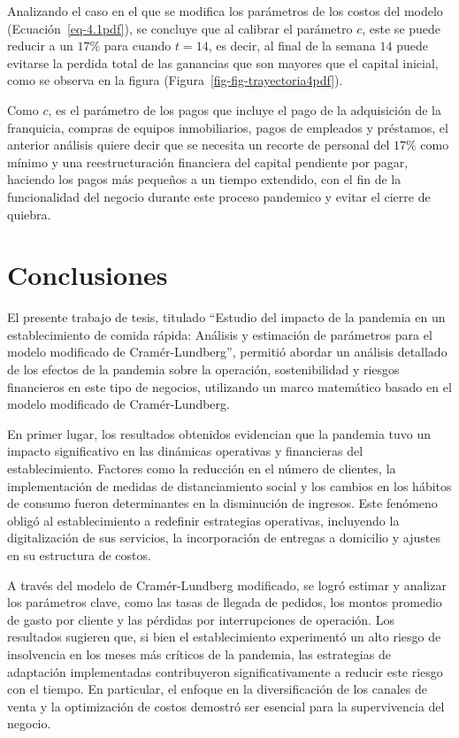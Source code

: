 \documentclass[
  us-letterpaper,
]{scrreprt}
\theoremstyle{plain}
\theoremstyle{plain}
\theoremstyle{definition}
\theoremstyle{remark}
\begin{document}
Analizando el caso en el que se modifica los parámetros de los costos
del modelo (Ecuación~\ref{eq-4.1pdf}), se concluye que al calibrar el
parámetro \(c\), este se puede reducir a un \(17 \%\) para cuando
\(t=14\), es decir, al final de la semana \(14\) puede evitarse la
perdida total de las ganancias que son mayores que el capital inicial,
como se observa en la figura (Figura~\ref{fig-fig-trayectoria4pdf}).

Como \(c\), es el parámetro de los pagos que incluye el pago de la
adquisición de la franquicia, compras de equipos inmobiliarios, pagos de
empleados y préstamos, el anterior análisis quiere decir que se necesita
un recorte de personal del \(17 \%\) como mínimo y una reestructuración
financiera del capital pendiente por pagar, haciendo los pagos más
pequeños a un tiempo extendido, con el fin de la funcionalidad del
negocio durante este proceso pandemico y evitar el cierre de quiebra.


\chapter{Conclusiones}\label{conclusiones}

El presente trabajo de tesis, titulado ``Estudio del impacto de la
pandemia en un establecimiento de comida rápida: Análisis y estimación
de parámetros para el modelo modificado de Cramér-Lundberg'', permitió
abordar un análisis detallado de los efectos de la pandemia sobre la
operación, sostenibilidad y riesgos financieros en este tipo de
negocios, utilizando un marco matemático basado en el modelo modificado
de Cramér-Lundberg.

En primer lugar, los resultados obtenidos evidencian que la pandemia
tuvo un impacto significativo en las dinámicas operativas y financieras
del establecimiento. Factores como la reducción en el número de
clientes, la implementación de medidas de distanciamiento social y los
cambios en los hábitos de consumo fueron determinantes en la disminución
de ingresos. Este fenómeno obligó al establecimiento a redefinir
estrategias operativas, incluyendo la digitalización de sus servicios,
la incorporación de entregas a domicilio y ajustes en su estructura de
costos.

A través del modelo de Cramér-Lundberg modificado, se logró estimar y
analizar los parámetros clave, como las tasas de llegada de pedidos, los
montos promedio de gasto por cliente y las pérdidas por interrupciones
de operación. Los resultados sugieren que, si bien el establecimiento
experimentó un alto riesgo de insolvencia en los meses más críticos de
la pandemia, las estrategias de adaptación implementadas contribuyeron
significativamente a reducir este riesgo con el tiempo. En particular,
el enfoque en la diversificación de los canales de venta y la
optimización de costos demostró ser esencial para la supervivencia del
negocio.
\end{document}
